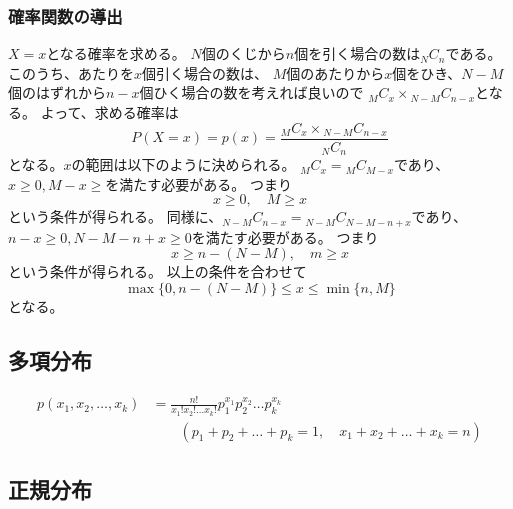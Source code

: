 \subsubsection{確率関数の導出}
\(X = x\)となる確率を求める。
\(N\)個のくじから\(n\)個を引く場合の数は\({}_{N} C_{n}\)である。
このうち、あたりを\(x\)個引く場合の数は、
\(M\)個のあたりから\(x\)個をひき、\(N - M\)個のはずれから\(n - x\)個ひく場合の数を考えれば良いので
\({}_{M} C_{x} \times {}_{N - M} C_{n - x}\)となる。
よって、求める確率は
\begin{equation}
  P(X = x) = p(x) = \frac{{}_M C_{x} \times {}_{N-M} C_{n-x}}{{}_{N} C_{n}}
\end{equation}
となる。\(x\)の範囲は以下のように決められる。
\({}_M C_x = {}_M C_{M-x}\)であり、\(x \geq 0, M-x \geq\)を満たす必要がある。
つまり
\begin{equation}
  x \geq 0, \quad M \geq x
\end{equation}
という条件が得られる。
同様に、\({}_{N - M} C_{n - x} = {}_{N - M} C_{N - M - n + x}\)であり、
\(n - x \geq 0, N - M - n + x \geq 0\)を満たす必要がある。
つまり
\begin{equation}
  x \geq n - (N - M), \quad m \geq x
\end{equation}
という条件が得られる。
以上の条件を合わせて
\begin{equation}
  \max \{0, n - (N - M)\} \leq x \leq \min \{n, M\}
\end{equation}
となる。



\subsection{多項分布}

\begin{outline}
  \1 [意味]
  
  \1 [確率関数]
  \begin{equation}
    \begin{aligned}
      p(x_1, x_2, \dots, x_k) & = \frac{n!}{x_1! x_2! \dots x_k!} p_1^{x_1} p_2^{x_2} \dots p_k^{x_k}   \\
                              & \qquad (p_1 + p_2 + \dots + p_k = 1, \quad x_1 + x_2 + \dots + x_k = n)
    \end{aligned}
  \end{equation}
\end{outline}



\subsection{正規分布}

